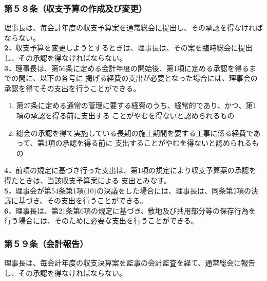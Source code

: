 \documentclass[
  luatex,
  paper=a4paper,
  fontsize=11pt,
  jafontsize=10pt,
  jlreq_notes,
]{jlreq}
\begin{document}
  \subsubsection*{第５８条（収支予算の作成及び変更）}
  理事長は、毎会計年度の収支予算案を通常総会に提出し、その承認を得なければならない。\\
  \textbf{2．}収支予算を変更しようとするときは、理事長は、その案を臨時総会に提出し、その承認を得なければならない。\\
  \textbf{3．}理事長は、第56条に定める会計年度の開始後、第1項に定める承認を得るまでの間に、以下の各号に
  掲げる経費の支出が必要となった場合には、理事会の承認を得てその支出を行うことができる。
  \begin{enumerate}
  \item 第27条に定める通常の管理に要する経費のうち、経常的であり、かつ、第1項の承認を得る前に支出する
        ことがやむを得ないと認められるもの
  \item 総会の承認を得て実施している長期の施工期間を要する工事に係る経費であって、第1項の承認を得る前に
        支出することがやむを得ないと認められるもの
  \end{enumerate}
  \textbf{4．}前項の規定に基づき行った支出は、第1項の規定により収支予算案の承認を得たときは、当該収支予算案による
  支出とみなす。\\
  \textbf{5．}理事会が第54条第1項(10)の決議をした場合には、理事長は、同条第2項の決議に基づき、その支出を行うことができる。\\
  \textbf{6．}理事長は、第21条第6項の規定に基づき、敷地及び共用部分等の保存行為を行う場合には、そのために必要な支出を行うことができる。
  \subsubsection*{第５９条（会計報告）}
  理事長は、毎会計年度の収支決算案を監事の会計監査を経て、通常総会に報告し、その承認を得なければならない。
\end{document}
